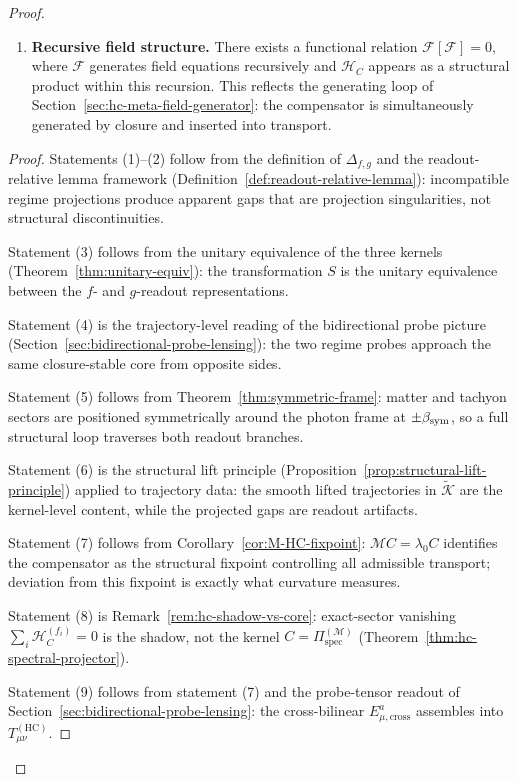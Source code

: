 \begin{proof}
\begin{theorem}
\begin{enumerate}[label=(\arabic*)]
  \item \textbf{Recursive field structure.}
  There exists a functional relation
  $\mathcal{F}[\mathcal{F}] = 0$,
  where $\mathcal{F}$ generates field equations recursively and
  $\mathcal{H}_C$ appears as a structural product within this
  recursion. This reflects the generating loop of
  Section~\ref{sec:hc-meta-field-generator}: the compensator is
  simultaneously generated by closure and inserted into transport.
\end{enumerate}
\end{theorem}

\begin{proof}
Statements (1)--(2) follow from the definition of $\Delta_{f,g}$ and
the readout-relative lemma framework
(Definition~\ref{def:readout-relative-lemma}): incompatible regime
projections produce apparent gaps that are projection singularities,
not structural discontinuities.

Statement (3) follows from the unitary equivalence of the three kernels
(Theorem~\ref{thm:unitary-equiv}): the transformation $S$ is the
unitary equivalence between the $f$- and $g$-readout representations.

Statement (4) is the trajectory-level reading of the bidirectional
probe picture (Section~\ref{sec:bidirectional-probe-lensing}): the two
regime probes approach the same closure-stable core from opposite sides.

Statement (5) follows from Theorem~\ref{thm:symmetric-frame}: matter
and tachyon sectors are positioned symmetrically around the photon frame
at $\pm\beta_{\mathrm{sym}}$, so a full structural loop traverses both readout
branches.

Statement (6) is the structural lift principle
(Proposition~\ref{prop:structural-lift-principle}) applied to
trajectory data: the smooth lifted trajectories in $\tilde{\mathcal{K}}$
are the kernel-level content, while the projected gaps are readout
artifacts.

Statement (7) follows from Corollary~\ref{cor:M-HC-fixpoint}:
$\mathcal{M}C = \lambda_0 C$ identifies the compensator as the
structural fixpoint controlling all admissible transport; deviation
from this fixpoint is exactly what curvature measures.

Statement (8) is Remark~\ref{rem:hc-shadow-vs-core}: exact-sector
vanishing $\sum_i \mathcal{H}_C^{(f_i)} = 0$ is the shadow, not the
kernel $C = \Pi^{(\mathcal{M})}_{\mathrm{spec}}$
(Theorem~\ref{thm:hc-spectral-projector}).

Statement (9) follows from statement (7) and the probe-tensor readout
of Section~\ref{sec:bidirectional-probe-lensing}: the cross-bilinear
$E^a_{\mu,\mathrm{cross}}$ assembles into $T_{\mu\nu}^{(\mathrm{HC})}$.


\end{proof}
\end{proof}
